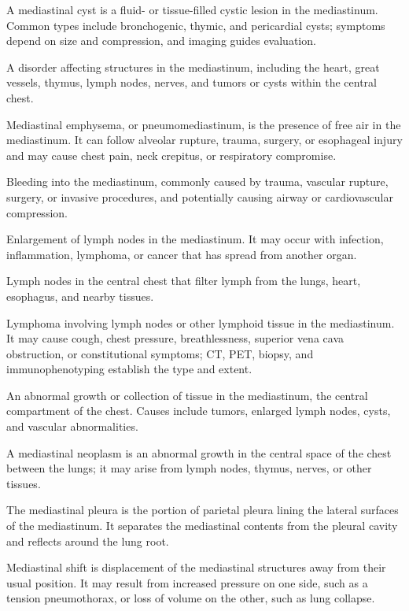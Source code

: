  A mediastinal cyst is a fluid- or tissue-filled cystic lesion in the mediastinum. Common types include bronchogenic, thymic, and pericardial cysts; symptoms depend on size and compression, and imaging guides evaluation.

 A disorder affecting structures in the mediastinum, including the heart, great vessels, thymus, lymph nodes, nerves, and tumors or cysts within the central chest.

 Mediastinal emphysema, or pneumomediastinum, is the presence of free air in the mediastinum. It can follow alveolar rupture, trauma, surgery, or esophageal injury and may cause chest pain, neck crepitus, or respiratory compromise.

 Bleeding into the mediastinum, commonly caused by trauma, vascular rupture, surgery, or invasive procedures, and potentially causing airway or cardiovascular compression.

 Enlargement of lymph nodes in the mediastinum. It may occur with infection, inflammation, lymphoma, or cancer that has spread from another organ.

 Lymph nodes in the central chest that filter lymph from the lungs, heart, esophagus, and nearby tissues.

 Lymphoma involving lymph nodes or other lymphoid tissue in the mediastinum. It may cause cough, chest pressure, breathlessness, superior vena cava obstruction, or constitutional symptoms; CT, PET, biopsy, and immunophenotyping establish the type and extent.

 An abnormal growth or collection of tissue in the mediastinum, the central compartment of the chest. Causes include tumors, enlarged lymph nodes, cysts, and vascular abnormalities.

 A mediastinal neoplasm is an abnormal growth in the central space of the chest between the lungs; it may arise from lymph nodes, thymus, nerves, or other tissues.

 The mediastinal pleura is the portion of parietal pleura lining the lateral surfaces of the mediastinum. It separates the mediastinal contents from the pleural cavity and reflects around the lung root.

 Mediastinal shift is displacement of the mediastinal structures away from their usual position. It may result from increased pressure on one side, such as a tension pneumothorax, or loss of volume on the other, such as lung collapse.

